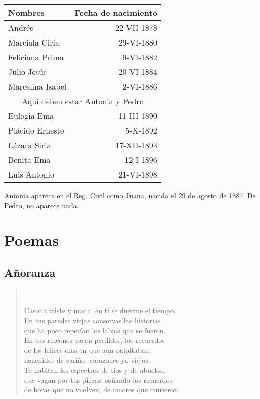 \documentclass{article}
\begin{document}
\begin{table}[htb]
    \centering
    \begin{tabular}{l r}
        Nombres & Fecha de nacimiento\\
        \midrule
        Andrés & 22-VII-1878\\
        Marciala Ciria & 29-VI-1880\\
        Feliciana Prima & 9-VI-1882\\
        Julio Jesús & 20-VI-1884\\
        Marcelina Isabel & 2-VI-1886\\
        \multicolumn{2}{c}{Aquí deben estar Antonia y Pedro}\\
        Eulogia Ema & 11-III-1890\\
        Plácido Ernesto & 5-X-1892\\
        Lázara Siria & 17-XII-1893\\
        Benita Ema & 12-I-1896\\
        Luis Antonio & 21-VI-1898\\
    \end{tabular}
\end{table}

Antonia aparece en el Reg. Civil como Juana, nacida el 29 de agosto de 1887. De Pedro, no aparece nada.

\section{Poemas}

\subsection{Añoranza}

\begin{verse}[\textwidth]

Casona triste y muda, en ti se duerme el tiempo.\\
En tus paredes viejas conservas las historias\\
que ha poco repetían los labios que se fueron.\\
En tus rincones yacen perdidos, los recuerdos\\
de los felices días en que aún palpitaban,\\
henchidos de cariño, corazones ya viejos.\\
Te habitan los espectros de tíos y de abuelos.\\
que vagan por tus piezas, soñando los recuerdos\\
de horas que no vuelven, de amores que murieron.

\end{verse}
\end{document}

